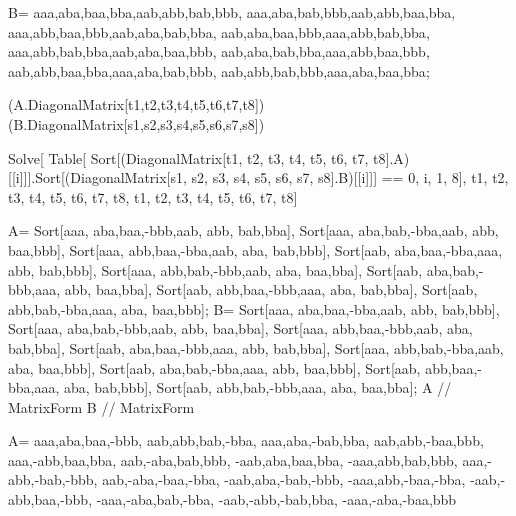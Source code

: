 B=                {{aaa,aba,baa,bba,aab,abb,bab,bbb},
                  {aaa,aba,bab,bbb,aab,abb,baa,bba},
                  {aaa,abb,baa,bbb,aab,aba,bab,bba},
                  {aab,aba,baa,bbb,aaa,abb,bab,bba},
                  {aaa,abb,bab,bba,aab,aba,baa,bbb},
                  {aab,aba,bab,bba,aaa,abb,baa,bbb},
                  {aab,abb,baa,bba,aaa,aba,bab,bbb},
                  {aab,abb,bab,bbb,aaa,aba,baa,bba}};


(A.DiagonalMatrix[{t1,t2,t3,t4,t5,t6,t7,t8}])
(B.DiagonalMatrix[{s1,s2,s3,s4,s5,s6,s7,s8}])


Solve[ Table[
    Sort[(DiagonalMatrix[{t1, t2, t3, t4, t5, t6, t7,
                    t8}].A)[[i]]].Sort[(DiagonalMatrix[{s1, s2, s3, s4, s5,
                    s6, s7, s8}].B)[[i]]] == 0, {i, 1, 8}], {t1, t2, t3, t4,
    t5, t6, t7, t8, t1, t2, t3, t4, t5, t6, t7, t8}]



A=               {Sort[{aaa, aba,baa,-bbb,aab,    abb, bab,bba}],
                  Sort[{aaa, aba,bab,-bba,aab,    abb, baa,bbb}],
                  Sort[{aaa, abb,baa,-bba,aab,    aba, bab,bbb}],
                  Sort[{aab, aba,baa,-bba,aaa,    abb, bab,bbb}],
                  Sort[{aaa, abb,bab,-bbb,aab,    aba, baa,bba}],
                  Sort[{aab, aba,bab,-bbb,aaa,    abb, baa,bba}],
                  Sort[{aab, abb,baa,-bbb,aaa,    aba, bab,bba}],
                  Sort[{aab, abb,bab,-bba,aaa,    aba, baa,bbb}]};
B=               {Sort[{aaa, aba,baa,-bba,aab,    abb, bab,bbb}],
                  Sort[{aaa, aba,bab,-bbb,aab,    abb, baa,bba}],
                  Sort[{aaa, abb,baa,-bbb,aab,    aba, bab,bba}],
                  Sort[{aab, aba,baa,-bbb,aaa,    abb, bab,bba}],
                  Sort[{aaa, abb,bab,-bba,aab,    aba, baa,bbb}],
                  Sort[{aab, aba,bab,-bba,aaa,    abb, baa,bbb}],
                  Sort[{aab, abb,baa,-bba,aaa,    aba, bab,bbb}],
                  Sort[{aab, abb,bab,-bbb,aaa,    aba, baa,bba}]};
A // MatrixForm
B // MatrixForm


A={                  {aaa,aba,baa,-bbb, aab,abb,bab,-bba},
                     {aaa,aba,-bab,bba, aab,abb,-baa,bbb},
                     {aaa,-abb,baa,bba, aab,-aba,bab,bbb},
                     {-aab,aba,baa,bba, -aaa,abb,bab,bbb},
                     {aaa,-abb,-bab,-bbb,  aab,-aba,-baa,-bba},
                     {-aab,aba,-bab,-bbb,  -aaa,abb,-baa,-bba},
                     {-aab,-abb,baa,-bbb,  -aaa,-aba,bab,-bba},
                     {-aab,-abb,-bab,bba,  -aaa,-aba,-baa,bbb}}

